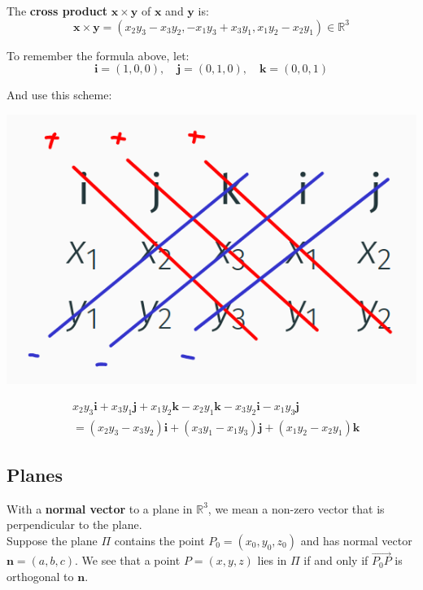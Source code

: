 \documentclass[11pt]{article}
\begin{document}
The \textbf{cross product} \(\boldsymbol{x} \times \boldsymbol{y}\) of \(\boldsymbol{x}\) and \(\boldsymbol{y}\) is:
\[\boldsymbol{x} \times \boldsymbol{y} = (x_2 y_3 - x_3 y_2, -x_1 y_3 + x_3 y_1, x_1 y_2 - x_2 y_1) \in \mathbb{R}^3\]

To remember the formula above, let:
\[\boldsymbol{i} = (1, 0, 0), \quad \boldsymbol{j} = (0, 1, 0), \quad \boldsymbol{k} = (0, 0, 1)\]

And use this scheme:

\begin{center}
\includegraphics[scale=1.0]{./images/cross-product.png}
\end{center}
\begin{align*}
&x_2 y_3 \boldsymbol{i} + x_3 y_1 \boldsymbol{j} + x_1 y_2 \boldsymbol{k} - x_2 y_1 \boldsymbol{k} - x_3 y_2 \boldsymbol{i} - x_1 y_3 \boldsymbol{j} \\
&= (x_2 y_3 - x_3 y_2) \boldsymbol{i} + (x_3 y_1 - x_1 y_3) \boldsymbol{j} + (x_1 y_2 - x_2 y_ 1) \boldsymbol{k}
\end{align*}

\subsection{Planes}
\label{sec:orgd993c89}
With a \textbf{normal vector} to a plane in \(\mathbb{R}^3\), we mean a non-zero vector that is perpendicular to the plane.
\\[0pt]

Suppose the plane \(\Pi\) contains the point \(P_0 = (x_0, y_0, z_0)\) and has normal vector \(\boldsymbol{n} = (a, b, c)\). We see that a point \(P = (x, y, z)\) lies in \(\Pi\) if and only if \(\overrightarrow{P_0P}\) is orthogonal to \(\boldsymbol{n}\).
\end{document}
